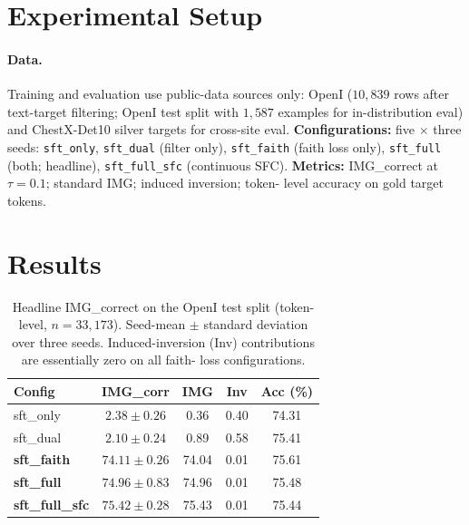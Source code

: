 \documentclass{article}
\begin{document}
\section{Experimental Setup}
\label{sec:setup}

\paragraph{Data.} Training and evaluation use public-data sources only:
OpenI \citep{demner2016openi} ($10{,}839$ rows after text-target
filtering; OpenI test split with $1{,}587$ examples for in-distribution
eval) and ChestX-Det10 silver targets \citep{liu2020chestxdet} for
cross-site eval. \textbf{Configurations:} five \texttt{$\times$} three
seeds: \texttt{sft\_only}, \texttt{sft\_dual} (filter only),
\texttt{sft\_faith} (faith loss only), \texttt{sft\_full} (both;
headline), \texttt{sft\_full\_sfc} (continuous SFC). \textbf{Metrics:}
IMG\_correct at $\tau = 0.1$; standard IMG; induced inversion; token-
level accuracy on gold target tokens.

\section{Results}
\label{sec:results}

\begin{table}[t]
\centering
\small
\setlength{\tabcolsep}{2.6pt}
\caption{Headline IMG\_correct on the OpenI test split (token-level,
$n = 33{,}173$). Seed-mean $\pm$ standard deviation over three seeds.
Induced-inversion (Inv) contributions are essentially zero on all faith-
loss configurations.}
\label{tab:headline}
\begin{tabular}{lcccc}
\toprule
\textbf{Config} & \textbf{IMG\_corr} & \textbf{IMG} & \textbf{Inv} & \textbf{Acc (\%)}\\
\midrule
sft\_only         & $2.38\pm0.26$  & 0.36  & 0.40 & 74.31 \\
sft\_dual         & $2.10\pm0.24$  & 0.89  & 0.58 & 75.41 \\
\textbf{sft\_faith}    & $\mathbf{74.11\pm0.26}$ & 74.04 & 0.01 & 75.61 \\
\textbf{sft\_full}     & $\mathbf{74.96\pm0.83}$ & 74.96 & 0.01 & 75.48 \\
\textbf{sft\_full\_sfc}& $\mathbf{75.42\pm0.28}$ & 75.43 & 0.01 & 75.44 \\
\bottomrule
\end{tabular}
\end{table}
\end{document}
